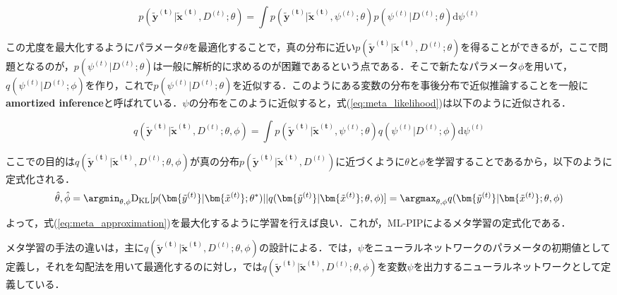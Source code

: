 \begin{equation}
p \left( \bm{\tilde { y } ^ { ( t ) }} | \bm{\tilde { x } ^ { ( t ) }}, D^{(t)} ; \theta \right) = \int p \left( \bm{\tilde { y } ^ { ( t ) }} | \bm{\tilde { x } ^ { ( t ) }} , \psi ^ { ( t ) } ; \theta \right) p \left( \psi ^ { ( t ) } | D^{(t)} ; \theta \right) \mathrm { d } \psi ^ { ( t ) } \label{eq:meta_likelihood}
\end{equation}

この尤度を最大化するようにパラメータ$\theta$を最適化することで，真の分布に近い$p(\bm{\tilde{y}^{(t)}} | \bm{\tilde{x}^{(t)}}, D^{(t)};\theta)$を得ることができるが，ここで問題となるのが，$p ( \psi ^ { ( t ) } | D^{(t)}; \theta)$は一般に解析的に求めるのが困難であるという点である．そこで新たなパラメータ$\phi$を用いて，$q(\psi ^ { ( t ) } | D^{(t)}; \phi )$を作り，これで$p ( \psi ^ { ( t ) } | D^{(t)}; \theta )$を近似する．このようにある変数の分布を事後分布で近似推論することを一般に{\bf amortized inference}と呼ばれている．$\psi$の分布をこのように近似すると，式(\ref{eq:meta_likelihood})は以下のように近似される．

\begin{equation}
q ( \bm{\tilde { y } ^ { ( t ) }} | \bm{\tilde { x } ^ { ( t ) }} , D^{(t)}; \theta , \phi ) = \int p ( \bm{\tilde { y } ^ { ( t ) }} | \bm{\tilde { x } ^ { ( t ) }} , \psi ^ {(t)} ; \theta ) q ( \psi ^ { ( t ) } | D ^ { ( t ) } ; \phi ) \mathrm { d } \psi ^ { ( t ) } \label{eq:meta_approximation}
\end{equation}

ここでの目的は$q ( \bm{\tilde { y } ^ { ( t ) }} | \bm{\tilde { x } ^ { ( t ) }} , D^{(t)}; \theta , \phi )$が真の分布$p ( \bm{\tilde { y } ^ { ( t ) }} | \bm{\tilde { x } ^ { ( t ) }} ,D^{(t)})$に近づくように$\theta$と$\phi$を学習することであるから，以下のように定式化される．
\begin{equation}
\hat{\theta}, \hat{\phi} = \argmin _ { \theta, \phi } \mathrm{D_{KL}} [p ( \bm{\tilde { y } ^ { ( t ) }} | \bm{\tilde { x } ^ { ( t ) }} ; \theta^{\ast} ) || q ( \bm{\tilde { y } ^ { ( t ) }} | \bm{\tilde { x } ^ { ( t ) }} ; \theta , \phi ) ]  = \argmax _ {\theta, \phi } q ( \bm{\tilde { y } ^ { ( t ) }} | \bm{\tilde { x } ^ { ( t ) }} ; \theta , \phi )
\end{equation}

よって，式(\ref{eq:meta_approximation})を最大化するように学習を行えば良い．これが，ML-PIPによるメタ学習の定式化である．

メタ学習の手法の違いは，主に$q ( \bm{\tilde { y } ^ { ( t ) }} | \bm{\tilde { x } ^ { ( t ) }} , D^{(t)}; \theta , \phi )$の設計による．\cite{maml}では，$\psi$をニューラルネットワークのパラメータの初期値として定義し，それを勾配法を用いて最適化するのに対し，\cite{CNP, NP}では$q ( \bm{\tilde { y } ^ { ( t ) }} | \bm{\tilde { x } ^ { ( t ) }} , D^{(t)}; \theta , \phi )$を変数$\psi$を出力するニューラルネットワークとして定義している．